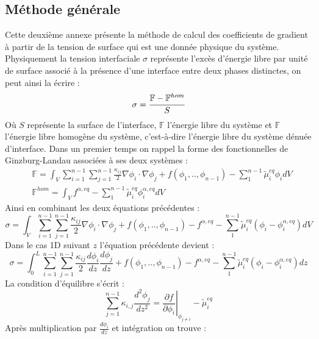 \begin{appendix}
\section{Méthode générale}
Cette deuxième annexe présente la méthode de calcul des coefficients de gradient à partir de la tension de surface qui est une donnée physique du système. Physiquement la tension interfaciale $\sigma$ représente l'excès d'énergie libre par unité de surface associé à la présence d'une interface entre deux phases distinctes, on peut ainsi la écrire :
\begin{equation}
\sigma = \cfrac{\mathbb{F}-\mathbb{F}^{hom}}{S}
\end{equation}
Où $S$ représente la surface de l'interface, $\mathbb{F}$ l'énergie libre du système et $\mathbb{F}$ l'énergie libre homogène du système, c'est-à-dire l'énergie libre du système dénuée d'interface. 
Dans un premier temps on rappel la forme des fonctionnelles de Ginzburg-Landau associées à ses deux systèmes :
\begin{align*}
&\mathbb{F} = \int_{V}\sum_{i=1}^{n-1}\sum_{j=1}^{n-1}\frac{\kappa_{ij}}{2}\nabla \phi_i \cdot \nabla \phi_j + f(\phi_1,..,\phi_{n-1}) - \sum_{1}^{n-1}\tilde{\mu}_i^{eq}\phi_i dV \\
&\mathbb{F}^{hom} = \int_V f^{\alpha,eq}  - \sum_{1}^{n-1}\tilde{\mu}_i^{eq}\phi_i^{\alpha,eq} dV 
\end{align*}
Ainsi en combinant les deux équations précédentes : 
\begin{equation}
\sigma = \int_{V}\sum_{i=1}^{n-1}\sum_{j=1}^{n-1}\frac{\kappa_{ij}}{2}\nabla \phi_i \cdot \nabla \phi_j + f(\phi_1,..,\phi_{n-1}) - f^{\alpha,eq} - \sum_{1}^{n-1}\tilde{\mu}_i^{eq}(\phi_i-\phi_i^{\alpha,eq}) dV
\end{equation}
Dans le cas 1D suivant $z$ l'équation précédente devient : 
\begin{equation}
\sigma = \int_{0}^L\sum_{i=1}^{n-1}\sum_{j=1}^{n-1}\frac{\kappa_{ij}}{2}\frac{ d\phi_i}{dz} \frac{ d\phi_j}{dz} + f(\phi_1,..,\phi_{n-1}) - f^{\alpha,eq} - \sum_{1}^{n-1}\tilde{\mu}_i^{eq}(\phi_i-\phi_i^{\alpha,eq}) dz
\end{equation}
La condition d'équilibre s'écrit :
\begin{equation}
\sum_{j=1}^{n-1} \kappa_{i,j} \frac{d^2\phi_j}{dz^2} = \left.\frac{\partial f}{\partial \phi_i}\right|_{\phi_{j\neq i}} - \tilde{\mu}_i^{eq}
\end{equation}
Après multiplication par $\displaystyle \frac{d\phi_i}{dz}$ et intégration on trouve :
\begin{equation}

\end{equation}
\end{appendix}
